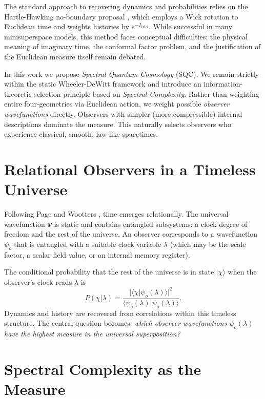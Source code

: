 \documentclass[11pt]{article}
\begin{document}
The standard approach to recovering dynamics and probabilities relies on the Hartle-Hawking no-boundary proposal \cite{hartle1983wave}, which employs a Wick rotation to Euclidean time and weights histories by \(e^{-I_{\text{Eucl}}}\).
While successful in many minisuperspace models, this method faces conceptual difficulties: the physical meaning of imaginary time, the conformal factor problem, and the justification of the Euclidean measure itself remain debated.

In this work we propose \textit{Spectral Quantum Cosmology} (SQC).
We remain strictly within the static Wheeler-DeWitt framework and introduce an information-theoretic selection principle based on \textit{Spectral Complexity}.
Rather than weighting entire four-geometries via Euclidean action, we weight possible \textit{observer wavefunctions} directly.
Observers with simpler (more compressible) internal descriptions dominate the measure.
This naturally selects observers who experience classical, smooth, law-like spacetimes.

\section{Relational Observers in a Timeless Universe}

Following Page and Wootters \cite{page1983clock,wootters1984time}, time emerges relationally.
The universal wavefunction \(\Psi\) is static and contains entangled subsystems: a clock degree of freedom and the rest of the universe.
An observer corresponds to a wavefunction \(\psi_o\) that is entangled with a suitable clock variable \(\lambda\) (which may be the scale factor, a scalar field value, or an internal memory register).

The conditional probability that the rest of the universe is in state \(|\chi\rangle\) when the observer's clock reads \(\lambda\) is
\begin{equation}
P(\chi | \lambda) = \frac{|\langle \chi | \psi_o(\lambda) \rangle|^2}{\langle \psi_o(\lambda) | \psi_o(\lambda) \rangle}.
\end{equation}
Dynamics and history are recovered from correlations within this timeless structure.
The central question becomes: \textit{which observer wavefunctions \(\psi_o(\lambda)\) have the highest measure in the universal superposition?}

\section{Spectral Complexity as the Measure}
\end{document}
